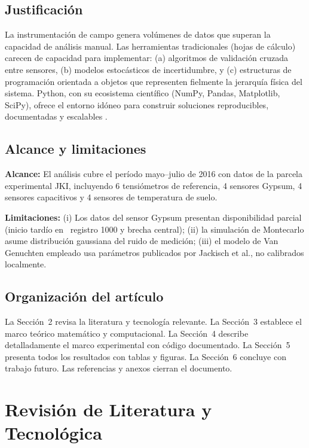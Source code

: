 \documentclass[12pt,a4paper]{article}
\begin{document}
\subsection{Justificación}

La instrumentación de campo genera volúmenes de datos que superan la capacidad de análisis manual. Las herramientas tradicionales (hojas de cálculo) carecen de capacidad para implementar: (a) algoritmos de validación cruzada entre sensores, (b) modelos estocásticos de incertidumbre, y (c) estructuras de programación orientada a objetos que representen fielmente la jerarquía física del sistema. Python, con su ecosistema científico (NumPy, Pandas, Matplotlib, SciPy), ofrece el entorno idóneo para construir soluciones reproducibles, documentadas y escalables \cite{mckinney2017}.

\subsection{Alcance y limitaciones}

\textbf{Alcance:} El análisis cubre el período mayo--julio de 2016 con datos de la parcela experimental JKI, incluyendo 6 tensiómetros de referencia, 4 sensores Gypsum, 4 sensores capacitivos y 4 sensores de temperatura de suelo.

\textbf{Limitaciones:} (i) Los datos del sensor Gypsum presentan disponibilidad parcial (inicio tardío en ~registro 1000 y brecha central); (ii) la simulación de Montecarlo asume distribución gaussiana del ruido de medición; (iii) el modelo de Van Genuchten empleado usa parámetros publicados por Jackisch et al., no calibrados localmente.

\subsection{Organización del artículo}

La Sección~2 revisa la literatura y tecnología relevante. La Sección~3 establece el marco teórico matemático y computacional. La Sección~4 describe detalladamente el marco experimental con código documentado. La Sección~5 presenta todos los resultados con tablas y figuras. La Sección~6 concluye con trabajo futuro. Las referencias y anexos cierran el documento.

\section{Revisión de Literatura y Tecnológica}
\end{document}
